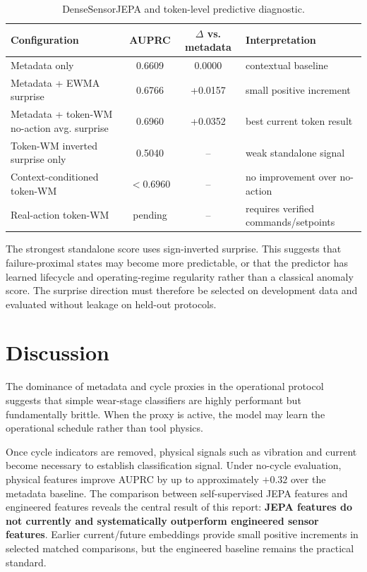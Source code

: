 \documentclass[10pt,journal,compsoc]{IEEEtran}
\begin{document}
\begin{table}[t]
\centering
\caption{DenseSensorJEPA and token-level predictive diagnostic.}
\label{tab:dense}
\footnotesize
\setlength{\tabcolsep}{4pt}
\renewcommand{\arraystretch}{1.12}
\begin{tabularx}{\textwidth}{@{}Y c c Y@{}}
\toprule
Configuration & AUPRC & $\Delta$ vs. metadata & Interpretation \\
\midrule
Metadata only & 0.6609 & 0.0000 & contextual baseline \\
Metadata + EWMA surprise & 0.6766 & +0.0157 & small positive increment \\
Metadata + token-WM no-action avg. surprise & 0.6960 & +0.0352 & best current token result \\
Token-WM inverted surprise only & 0.5040 & -- & weak standalone signal \\
Context-conditioned token-WM & $<0.6960$ & -- & no improvement over no-action \\
Real-action token-WM & pending & -- & requires verified commands/setpoints \\
\bottomrule
\end{tabularx}
\end{table}

The strongest standalone score uses sign-inverted surprise. This suggests that failure-proximal states may become more predictable, or that the predictor has learned lifecycle and operating-regime regularity rather than a classical anomaly score. The surprise direction must therefore be selected on development data and evaluated without leakage on held-out protocols.

\section{Discussion}
The dominance of metadata and cycle proxies in the operational protocol suggests that simple wear-stage classifiers are highly performant but fundamentally brittle. When the proxy is active, the model may learn the operational schedule rather than tool physics.

Once cycle indicators are removed, physical signals such as vibration and current become necessary to establish classification signal. Under no-cycle evaluation, physical features improve AUPRC by up to approximately $+0.32$ over the metadata baseline. The comparison between self-supervised JEPA features and engineered features reveals the central result of this report: \textbf{JEPA features do not currently and systematically outperform engineered sensor features}. Earlier current/future embeddings provide small positive increments in selected matched comparisons, but the engineered baseline remains the practical standard.
\end{document}

